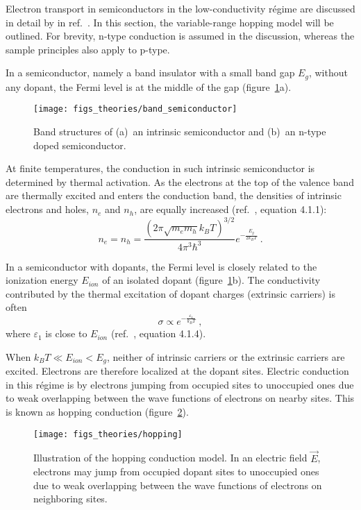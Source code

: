 Electron transport in semiconductors in the low-conductivity r\'egime are discussed in detail by \citeauthor{schklovskii_efros} in ref.~\cite{schklovskii_efros}. In this section, the variable-range hopping model will be outlined. For brevity, n-type conduction is assumed in the discussion, whereas the sample principles also apply to p-type.

In a semiconductor, namely a band insulator with a small band gap $E_g$, without any dopant, the Fermi level is at the middle of the gap (figure~\ref{fig:band_semiconductor}a). %
\begin{figure}[ht]%
    \centering%
    \texttt{[image: figs\_theories/band\_semiconductor]}%
    \caption[Band structures of an intrinsic semiconductor and an n-type doped semiconductor]{\label{fig:band_semiconductor}Band structures of (a)~an intrinsic semiconductor and (b)~an n-type doped semiconductor.}%
\end{figure}%
%
At finite temperatures, the conduction in such intrinsic semiconductor is determined by thermal activation. As the electrons at the top of the valence band are thermally excited and enters the conduction band, the densities of intrinsic electrons and holes, $n_e$ and $n_h$, are equally increased (ref.~\cite{schklovskii_efros}, equation 4.1.1):%
\begin{equation}
    n_e = n_h = \frac{\left(2\pi\sqrt{m_e m_h}k_B T\right)^{3/2}}{4\pi^3\hbar^3}e^{-\frac{E_g}{2 k_B T}}~.
\end{equation}

In a semiconductor with dopants, the Fermi level is closely related to the ionization energy $E_{ion}$ of an isolated dopant (figure~\ref{fig:band_semiconductor}b). The conductivity contributed by the thermal excitation of dopant charges (extrinsic carriers) is often%
\begin{equation}
    \sigma \propto e^{-\frac{\varepsilon_1}{k_B T}}~,\label{eq:activation}
\end{equation}%
where $\varepsilon_1$ is close to $E_{ion}$ (ref.~\cite{schklovskii_efros}, equation 4.1.4).

When $k_B T \ll E_{ion} < E_g$, neither of intrinsic carriers or the extrinsic carriers are excited. Electrons are therefore localized at the dopant sites. Electric conduction in this r\'egime is by electrons jumping from occupied sites to unoccupied ones due to weak overlapping between the wave functions of electrons on nearby sites. This is known as hopping conduction (figure~\ref{fig:hopping}).%
\begin{figure}[ht]%
    \centering%
    \texttt{[image: figs\_theories/hopping]}%
    \caption[Hopping conduction model]{\label{fig:hopping}Illustration of the hopping conduction model. In an electric field $\vec{E}$, electrons may jump from occupied dopant sites to unoccupied ones due to weak overlapping between the wave functions of electrons on neighboring sites.}%
\end{figure}%

